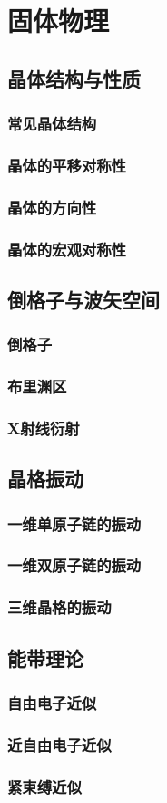\part{固体物理}
\chapter{晶体结构与性质}
\section{常见晶体结构}
\section{晶体的平移对称性}
\section{晶体的方向性}
\section{晶体的宏观对称性}

\chapter{倒格子与波矢空间}
\section{倒格子}
\section{布里渊区}
\section{X射线衍射}

\chapter{晶格振动}
\section{一维单原子链的振动}
\section{一维双原子链的振动}
\section{三维晶格的振动}

\chapter{能带理论}
\section{自由电子近似}
\section{近自由电子近似}
\section{紧束缚近似}